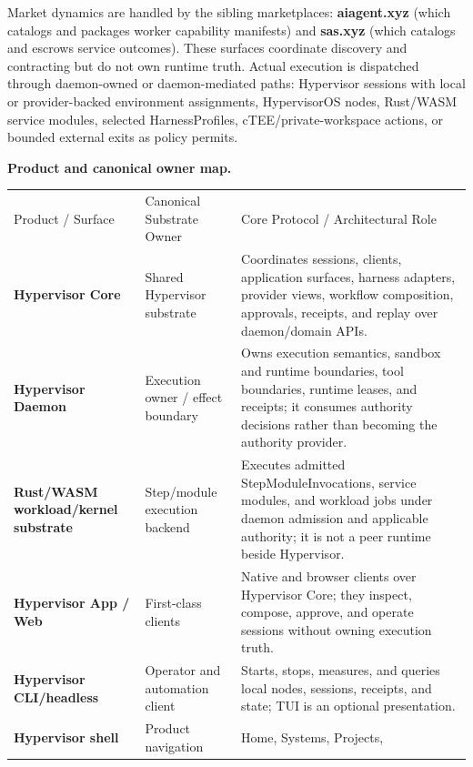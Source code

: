 \documentclass[
  11pt,
]{article}
\begin{document}
Market dynamics are handled by the sibling marketplaces:
\textbf{aiagent.xyz} (which catalogs and packages worker capability
manifests) and \textbf{sas.xyz} (which catalogs and escrows service
outcomes). These surfaces coordinate discovery and contracting but do
not own runtime truth. Actual execution is dispatched through
daemon-owned or daemon-mediated paths: Hypervisor sessions with local or
provider-backed environment assignments, HypervisorOS nodes, Rust/WASM service modules,
selected HarnessProfiles, cTEE/private-workspace actions, or bounded
external exits as policy permits.

\textbf{Product and canonical owner map.}

\begin{longtable}[]{@{}
  >{\raggedright\arraybackslash}p{}
  >{\raggedright\arraybackslash}p{}
  >{\raggedright\arraybackslash}p{}@{}}
\toprule\noalign{}
& & \\
\midrule\noalign{}
\endhead
\bottomrule\noalign{}
\endlastfoot
Product / Surface & Canonical Substrate Owner & Core Protocol /
Architectural Role \\
\textbf{Hypervisor Core} & Shared Hypervisor substrate & Coordinates
sessions, clients, application surfaces, harness adapters, provider views,
workflow composition, approvals, receipts, and replay over daemon/domain
APIs. \\
\textbf{Hypervisor Daemon} & Execution owner / effect boundary & Owns
execution semantics, sandbox and runtime boundaries, tool boundaries,
runtime leases, and receipts; it consumes authority decisions rather than
becoming the authority provider. \\
\textbf{Rust/WASM workload/kernel substrate} & Step/module execution
backend & Executes admitted StepModuleInvocations, service modules, and
workload jobs under daemon admission and applicable authority; it is not a peer runtime beside
Hypervisor. \\
\textbf{Hypervisor App / Web} & First-class clients & Native and browser
clients over Hypervisor Core; they inspect, compose, approve, and operate
sessions without owning execution truth. \\
\textbf{Hypervisor CLI/headless} & Operator and automation client &
Starts, stops, measures, and queries local nodes, sessions, receipts, and
state; TUI is an optional presentation. \\
\textbf{Hypervisor shell} & Product navigation & Home, Systems, Projects,

\end{longtable}
\end{document}
